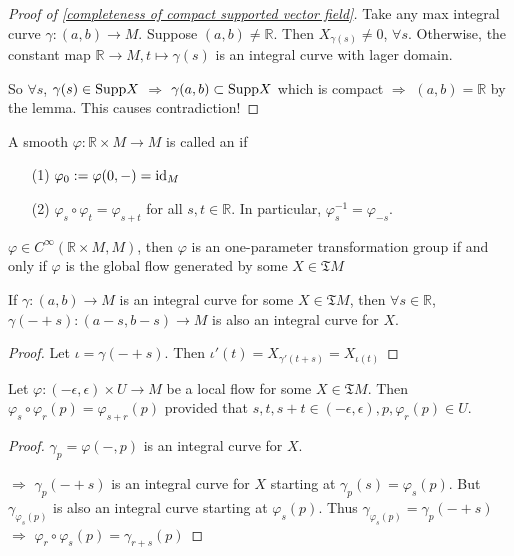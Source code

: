 \begin{proof}[Proof of \ref{completeness of compact supported vector field}]
    Take any max integral curve  $ \gamma:(a,b)\rightarrow M $. Suppose  $ (a,b)\not=\mathbb{R} $. Then  $ X_{\gamma(s)}\not=0 $, $ \forall s $. Otherwise, the constant map  $ \mathbb{R}\rightarrow M,t\mapsto \gamma(s) $ is an integral curve with lager domain.
    
    So  $ \forall s $,  $ \gamma(s)\in \mathrm{Supp} X $ $ \Rightarrow  $ $ \gamma(a,b)\subset \mathrm{Supp} X $ which is compact  $ \Rightarrow $  $ (a,b)=\mathbb{R} $ by the lemma. This causes contradiction!      
\end{proof}
A smooth  $ \varphi:\mathbb{R}\times M\rightarrow M $ is called an  if 
\begin{enumerate}
    \item[(1)]  $ \varphi_0:=\varphi(0,-)=\mathrm{id}_M $ 
    \item[(2)]  $ \varphi_s\circ \varphi_t=\varphi_{s+t} $ for all  $ s,t\in \mathbb{R} $. In particular,  $ \varphi_s^{-1}=\varphi_{-s} $.   
\end{enumerate} 
\begin{theorem}\label{equivalence of one-parameter transformation group}
     $ \varphi\in C^\infty(\mathbb{R}\times M,M) $, then  $ \varphi $ is an one-parameter transformation group if and only if  $ \varphi $ is the global flow generated by some  $ X\in \mathfrak{T}M $   
\end{theorem}
\begin{lemma}
    If  $ \gamma:(a,b)\rightarrow M $ is an integral curve for some  $ X\in \mathfrak{T}M $, then  $ \forall s\in \mathbb{R} $,  $ \gamma(-+s) :(a-s,b-s)\rightarrow M$ is also an integral curve for  $ X$.   
\end{lemma}
\begin{proof}
    Let $ \iota=\gamma(-+s) $. Then  $ \iota'(t)=X_{\gamma'(t+s)}=X_{\iota(t)} $  
\end{proof}
\begin{lemma}
    Let  $ \varphi:(-\epsilon,\epsilon)\times U\rightarrow M $ be a local flow for some  $ X\in \mathfrak{T}M $. Then  $ \varphi_s\circ \varphi_r(p)=\varphi_{s+r}(p) $ provided that  $ s,t,s+t\in (-\epsilon,\epsilon), p,\varphi_r(p)\in U $.    
\end{lemma}
\begin{proof}
     $ \gamma_p=\varphi(-,p) $ is an integral curve for  $ X $.
     
      $ \Rightarrow  $  $ \gamma_p(-+s) $ is an integral curve for  $ X  $ starting at  $ \gamma_p(s)=\varphi_s(p) $. But  $ \gamma_{\varphi_s(p)} $ is also an integral curve starting at  $ \varphi_s(p) $. Thus  $ \gamma_{\varphi_s(p)}=\gamma_p(-+s) $ $ \Rightarrow $  $ \varphi_r\circ \varphi_s(p)=\gamma_{r+s}(p) $     
\end{proof}
